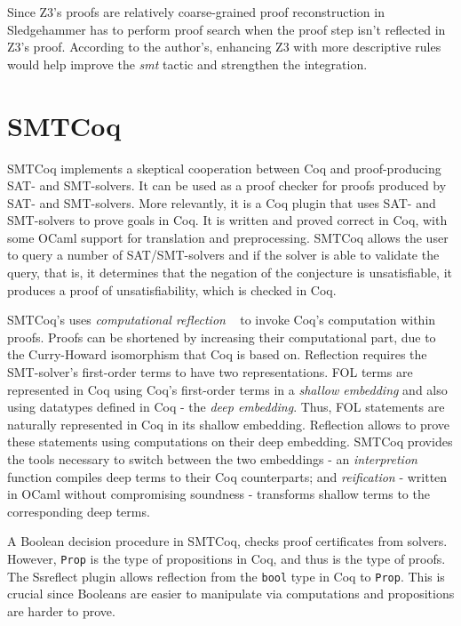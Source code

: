 \documentclass{article}
\begin{document}
		Since Z3's proofs are relatively coarse-grained
		proof reconstruction in Sledgehammer has to perform
		proof search when the proof step isn't reflected 
		in Z3's proof. According to the author's, 
		enhancing Z3 with more descriptive rules would 
		help improve the \textit{smt} tactic and strengthen 
		the integration.
		
\section{SMTCoq}
\label{sec:cert}
	SMTCoq implements a skeptical cooperation between 
	Coq and proof-producing SAT- and SMT-solvers. 
	It can be used as a proof checker for proofs 
	produced by SAT- and SMT-solvers. More relevantly, 
	it is a Coq plugin that uses SAT- and SMT-solvers to 
	prove goals in Coq. It is written and proved 
	correct in Coq, with some OCaml support for 
	translation and preprocessing. SMTCoq allows 
	the user to query a number of SAT/SMT-solvers 
	and if the solver is able to validate the query, 
	that is, it determines that the negation of the 
	conjecture is unsatisfiable, it produces a proof 
	of unsatisfiability, which is checked in Coq.
	
	SMTCoq's uses \textit{computational reflection}
	~\cite{113737} to invoke Coq's computation within 
	proofs. Proofs can be shortened by increasing 
	their computational	part, due to the 
	Curry-Howard isomorphism that Coq is based on. 
	Reflection requires the SMT-solver's first-order
	terms to have two representations. FOL terms are 
	represented in Coq using Coq's first-order 
	terms in a \textit{shallow embedding} and also 
	using datatypes defined in Coq - the 
	\textit{deep embedding}. Thus, FOL statements 
	are naturally represented in Coq in its 
	shallow embedding. Reflection allows to 
	prove these statements using computations 
	on their deep embedding. SMTCoq provides 
	the tools necessary to switch between the 
	two embeddings - an \textit{interpretion} 
	function compiles deep terms to their Coq 
	counterparts; and \textit{reification} 
	- written in OCaml without compromising 
	soundness - transforms shallow terms to the 
	corresponding deep terms.
	
	A Boolean decision procedure in SMTCoq, checks 
	proof certificates from solvers. However, 
	\texttt{Prop} is the type of propositions 
	in Coq, and thus is the type of proofs. 
	The Ssreflect plugin allows reflection from 
	the \texttt{bool} type in Coq to \texttt{Prop}.
	This is crucial since Booleans are easier to 
	manipulate via computations and propositions are 
	harder to prove.
	
\end{document}
